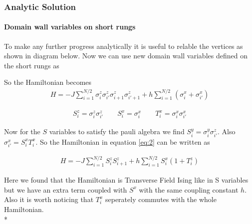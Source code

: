 \documentclass[a4paper]{extarticle}
\begin{document}
\subsubsection{Analytic Solution}

\paragraph{Domain wall variables on short rungs}


To make any further progress analytically it is useful to relable the vertices as shown in diagram below. Now we can use new domain wall variables defined on the short rungs as
\vspace{5mm}

So the Hamiltonian becomes
\begin{eqnarray} \label{eq:4}
H = -J\sum_{i=1}^{N/2} {\sigma_i^z \sigma_{i'}^z \sigma_{i+1}^z \sigma_{i'+1}^z} + h\sum_{i=1}^{N/2} (\sigma_i^x + \sigma_{i'}^x)
\end{eqnarray}


\begin{eqnarray} \label{eq:5}
S_i^z = \sigma_i^z \sigma_{i'}^z \qquad S_i^x = \sigma_i^x \qquad T_i^x = \sigma_{i}^x\sigma_{i'}^x
\end{eqnarray}

Now for the $S$ variables to satisfy the pauli algebra we find $S_i^y = \sigma_i^y \sigma_{i'}^z$. Also $\sigma_{i'}^x = S_i^x T_i^x$. So the Hamiltonian in equation \ref{eq:2} can be written as

\begin{eqnarray} \label{eq:6}
H = -J\sum_{i=1}^{N/2} {S_{i}^z S_{i+1}^z} + h\sum_{i=1}^{N/2} S_i^x(1 + T_i^z)
\end{eqnarray}

Here we found that the Hamiltonian is Transverse Field Ising like in S variables but we have an extra term coupled with $S^x$ with the same coupling constant $h$. Also it is worth noticing that $T_i^x$ seperately commutes with the whole Hamiltonian. \\*
\end{document}

